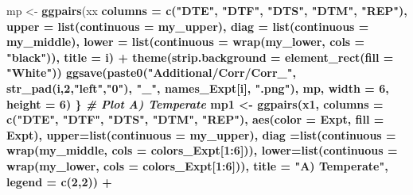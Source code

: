 \documentclass[
]{article}
\newenvironment{Shaded}{\begin{snugshade}}{\end{snugshade}}
\newcommand{\CommentTok}[1]{\textcolor[rgb]{0.56,0.35,0.01}{\textit{#1}}}
\newcommand{\DataTypeTok}[1]{\textcolor[rgb]{0.13,0.29,0.53}{#1}}
\newcommand{\DecValTok}[1]{\textcolor[rgb]{0.00,0.00,0.81}{#1}}
\newcommand{\KeywordTok}[1]{\textcolor[rgb]{0.13,0.29,0.53}{\textbf{#1}}}
\newcommand{\NormalTok}[1]{#1}
\newcommand{\OperatorTok}[1]{\textcolor[rgb]{0.81,0.36,0.00}{\textbf{#1}}}
\newcommand{\StringTok}[1]{\textcolor[rgb]{0.31,0.60,0.02}{#1}}
\begin{document}
\begin{Shaded}
\begin{Highlighting}[]
{{{{\NormalTok{  mp <-}\StringTok{ }\KeywordTok{ggpairs}\NormalTok{(xx }\OperatorTok{%
               \DataTypeTok{columns =} \KeywordTok{c}\NormalTok{(}\StringTok{"DTE"}\NormalTok{, }\StringTok{"DTF"}\NormalTok{, }\StringTok{"DTS"}\NormalTok{, }\StringTok{"DTM"}\NormalTok{, }\StringTok{"REP"}\NormalTok{), }
        \DataTypeTok{upper  =} \KeywordTok{list}\NormalTok{(}\DataTypeTok{continuous =}\NormalTok{ my_upper), }
        \DataTypeTok{diag   =} \KeywordTok{list}\NormalTok{(}\DataTypeTok{continuous =}\NormalTok{ my_middle),}
        \DataTypeTok{lower  =} \KeywordTok{list}\NormalTok{(}\DataTypeTok{continuous =} \KeywordTok{wrap}\NormalTok{(my_lower, }\DataTypeTok{cols =} \StringTok{"black"}\NormalTok{)),}
        \DataTypeTok{title  =}\NormalTok{ i) }\OperatorTok{+}\StringTok{ }
\StringTok{    }\KeywordTok{theme}\NormalTok{(}\DataTypeTok{strip.background =} \KeywordTok{element_rect}\NormalTok{(}\DataTypeTok{fill =} \StringTok{"White"}\NormalTok{))}
  \KeywordTok{ggsave}\NormalTok{(}\KeywordTok{paste0}\NormalTok{(}\StringTok{"Additional/Corr/Corr_"}\NormalTok{, }\KeywordTok{str_pad}\NormalTok{(i,}\DecValTok{2}\NormalTok{,}\StringTok{"left"}\NormalTok{,}\StringTok{"0"}\NormalTok{), }\StringTok{"_"}\NormalTok{, names_Expt[i], }\StringTok{".png"}\NormalTok{), }
\NormalTok{         mp, }\DataTypeTok{width =} \DecValTok{6}\NormalTok{, }\DataTypeTok{height =} \DecValTok{6}\NormalTok{)}
\NormalTok{\}}
\CommentTok{# Plot A) Temperate}
\NormalTok{mp1 <-}\StringTok{ }\KeywordTok{ggpairs}\NormalTok{(x1, }\DataTypeTok{columns =} \KeywordTok{c}\NormalTok{(}\StringTok{"DTE"}\NormalTok{, }\StringTok{"DTF"}\NormalTok{, }\StringTok{"DTS"}\NormalTok{, }\StringTok{"DTM"}\NormalTok{, }\StringTok{"REP"}\NormalTok{), }
               \KeywordTok{aes}\NormalTok{(}\DataTypeTok{color =}\NormalTok{ Expt, }\DataTypeTok{fill =}\NormalTok{ Expt),}
        \DataTypeTok{upper=}\KeywordTok{list}\NormalTok{(}\DataTypeTok{continuous =}\NormalTok{ my_upper),}
        \DataTypeTok{diag =}\KeywordTok{list}\NormalTok{(}\DataTypeTok{continuous =} \KeywordTok{wrap}\NormalTok{(my_middle, }\DataTypeTok{cols =}\NormalTok{ colors_Expt[}\DecValTok{1}\OperatorTok{:}\DecValTok{6}\NormalTok{])),}
        \DataTypeTok{lower=}\KeywordTok{list}\NormalTok{(}\DataTypeTok{continuous =} \KeywordTok{wrap}\NormalTok{(my_lower,  }\DataTypeTok{cols =}\NormalTok{ colors_Expt[}\DecValTok{1}\OperatorTok{:}\DecValTok{6}\NormalTok{])),}
        \DataTypeTok{title =} \StringTok{"A) Temperate"}\NormalTok{, }
        \DataTypeTok{legend =} \KeywordTok{c}\NormalTok{(}\DecValTok{2}\NormalTok{,}\DecValTok{2}\NormalTok{)) }\OperatorTok{+}
}}}}}
\end{Highlighting}
\end{Shaded}
\end{document}
